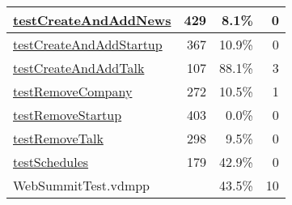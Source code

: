 \begin{longtable}{|l|r|r|r|}
\hline
\hyperref[testCreateAndAddNews:429]{testCreateAndAddNews} & 429&8.1\% & 0 \\
\hline
\hyperref[testCreateAndAddStartup:367]{testCreateAndAddStartup} & 367&10.9\% & 0 \\
\hline
\hyperref[testCreateAndAddTalk:107]{testCreateAndAddTalk} & 107&88.1\% & 3 \\
\hline
\hyperref[testRemoveCompany:272]{testRemoveCompany} & 272&10.5\% & 1 \\
\hline
\hyperref[testRemoveStartup:403]{testRemoveStartup} & 403&0.0\% & 0 \\
\hline
\hyperref[testRemoveTalk:298]{testRemoveTalk} & 298&9.5\% & 0 \\
\hline
\hyperref[testSchedules:179]{testSchedules} & 179&42.9\% & 0 \\
\hline
\hline
WebSummitTest.vdmpp & & 43.5\% & 10 \\
\hline
\end{longtable}

